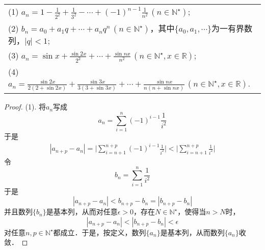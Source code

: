 \documentclass{ctexart}
\theoremstyle{definition}
\theoremstyle{definition}
\theoremstyle{plain}
\theoremstyle{plain}
\theoremstyle{plain}
\theoremstyle{definition}
\begin{document}
\begin{table}[H]
    \centering
    \begin{tabularx}{\textwidth} { >{\raggedright\arraybackslash}X }
    (1) $\displaystyle a_n = 1-\frac{1}{2^2}+\frac{1}{3^2}-\cdots+(-1)^{n-1}\frac{1}{n^2}\, (n\in\mathbb{N}^\star)$; \\ [0.7em]
    (2) $\displaystyle b_n = a_0 + a_1 q + \cdots + a_n q^n \, (n \in \mathbb{N}^\star)$，其中$\{a_0,a_1,\cdots\}$为一有界数列，$|q|<1$; \\ [0.7em]
    (3) $a_n = \displaystyle \sin x + \frac{\sin 2x}{2^2} + \cdots + \frac{\sin nx}{n^2}\, (n \in \mathbb{N}^\star, x \in \mathbb{R})$; \\ [0.7em]
    (4) $a_n = \displaystyle \frac{\sin 2x}{2(2+\sin 2x)} + \frac{\sin 3x}{3(3+\sin 3x)} + \cdots + \frac{\sin nx}{n(n+\sin nx)} \, (n\in\mathbb{N}^\star, x \in \mathbb{R})$.
    \end{tabularx}
\end{table}

\begin{proof}
(1). 将$a_n$写成
\begin{equation}
    a_n = \sum_{i=1}^n (-1)^{i-1} \frac{1}{i^2}
\end{equation}
于是
\begin{align}
    |a_{n+p}-a_n| = \Bigg\lvert\sum_{i=n+1}^{n+p} (-1)^{i-1}\frac{1}{i^2} \Bigg\rvert < \Bigg\lvert \sum_{i=n+1}^{n+p} \frac{1}{i^2} \Bigg\rvert
\end{align}
令
\begin{equation}
    b_n = \sum_{i=1}^n \frac{1}{i^2}
\end{equation}
于是
\begin{equation}
    |a_{n+p}-a_n|<b_{n+p} - b_n =|b_{n+p}-b_n|
\end{equation}
并且数列$\{ b_n \}$是基本列，从而对任意$\epsilon > 0$，存在$N \in \mathbb{N}^\star$，使得当$n > N$时，
\begin{equation}
    |a_{n+p}-a_n|<|b_{n+p}-b_n|<\epsilon
\end{equation}
对任意$n,p \in \mathbb{N}^\star$都成立．于是，按定义，数列$\{a_n\}$是基本列，从而数列$\{a_n\}$收敛．
\end{proof}
\end{document}
